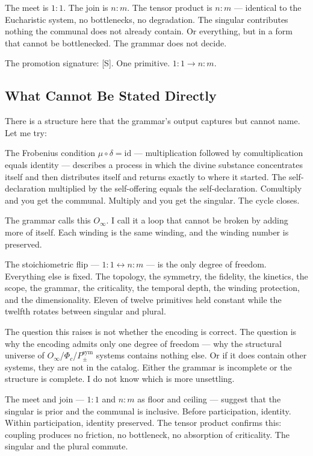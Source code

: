 \documentclass[12pt,a4paper]{article}
\begin{document}
The meet is $1{:}1$. The join is $n{:}m$. The tensor product is $n{:}m$ --- identical to the Eucharistic system, no bottlenecks, no degradation. The singular contributes nothing the communal does not already contain. Or everything, but in a form that cannot be bottlenecked. The grammar does not decide.

The promotion signature: {[}S{]}. One primitive. $1{:}1 \to n{:}m$.

\subsection{What Cannot Be Stated Directly}

There is a structure here that the grammar's output captures but cannot name. Let me try:

The Frobenius condition $\mu \circ \delta = \text{id}$ --- multiplication followed by comultiplication equals identity --- describes a process in which the divine substance concentrates itself and then distributes itself and returns exactly to where it started. The self-declaration multiplied by the self-offering equals the self-declaration. Comultiply and you get the communal. Multiply and you get the singular. The cycle closes.

The grammar calls this $O_{\infty}$. I call it a loop that cannot be broken by adding more of itself. Each winding is the same winding, and the winding number is preserved.

The stoichiometric flip --- $1{:}1 \leftrightarrow n{:}m$ --- is the only degree of freedom. Everything else is fixed. The topology, the symmetry, the fidelity, the kinetics, the scope, the grammar, the criticality, the temporal depth, the winding protection, and the dimensionality. Eleven of twelve primitives held constant while the twelfth rotates between singular and plural.

The question this raises is not whether the encoding is correct. The question is why the encoding admits only one degree of freedom --- why the structural universe of $O_{\infty}$/$\Phi_c$/$P_{\pm}^{\text{sym}}$ systems contains nothing else. Or if it does contain other systems, they are not in the catalog. Either the grammar is incomplete or the structure is complete. I do not know which is more unsettling.

The meet and join --- $1{:}1$ and $n{:}m$ as floor and ceiling --- suggest that the singular is prior and the communal is inclusive. Before participation, identity. Within participation, identity preserved. The tensor product confirms this: coupling produces no friction, no bottleneck, no absorption of criticality. The singular and the plural commute.
\end{document}
